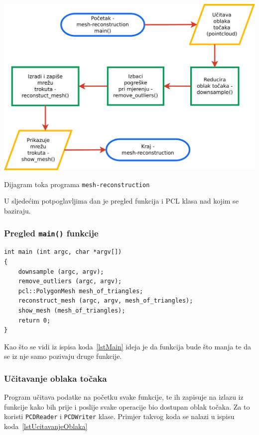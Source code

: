 \begin{graphic}
    \centering
    \includegraphics[scale=0.5]{figures/flowchart.pdf}
    \caption{Dijagram toka programa \texttt{mesh-reconstruction} }
    \label{fig:flowchart}
\end{graphic}

U sljedećim potpoglavljima dan je pregled funkcija i PCL klasa nad kojim
se baziraju.

\subsubsection{Pregled \texttt{main()} funkcije} %
\label{ssub:Pregled main funkcije}
\begin{lstlisting}[label=lstMain,caption={Izvorni kod
\texttt{main() funkcije} }]
int main (int argc, char *argv[])
{
    downsample (argc, argv);
    remove_outliers (argc, argv);
    pcl::PolygonMesh mesh_of_triangles;
    reconstruct_mesh (argc, argv, mesh_of_triangles);
    show_mesh (mesh_of_triangles);
    return 0;
}
\end{lstlisting}
Kao što se vidi iz ispisa koda~\ref{lstMain} ideja je da funkcija bude
što manja te da se iz nje samo pozivaju druge funkcije.


\subsubsection{Učitavanje oblaka točaka} %
\label{ssub:Učitavanje oblaka točaka}
Program učitava podatke na početku svake funkcije, te ih zapisuje na
izlazu iz funkcije kako bih prije i poslije svake operacije bio dostupan
oblak točaka. Za to koristi \texttt{PCDReader} i \texttt{PCDWriter} klase.
Primjer takvog koda se nalazi u ispisu koda~\ref{lstUcitavanjeOblaka}

